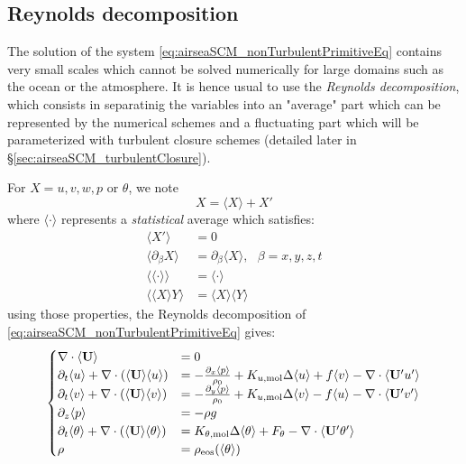 \subsection{Reynolds decomposition}
The solution of the system \eqref{eq:airseaSCM_nonTurbulentPrimitiveEq}
contains very small scales which cannot be solved numerically for
large domains such as the ocean or the atmosphere. It is hence usual
to use the \textit{Reynolds decomposition}, which consists in
separatinig the variables into an "average" part which can be
represented by the numerical schemes and a fluctuating part which
will be parameterized with turbulent closure schemes
(detailed later in \S \ref{sec:airseaSCM_turbulentClosure}).
\par
For $X=u, v, w, p$ or $\theta$, we note
\begin{equation}
	X = \langle X\rangle + X'
\end{equation}
where $\langle \cdot \rangle$ represents a \textit{statistical}
average which satisfies:
\begin{equation}
\begin{aligned}
	\langle X' \rangle &= 0 \\
	\langle \partial_\beta X \rangle &=
	\partial_\beta \langle  X \rangle, ~~~\beta=x,y,z,t \\
	\langle\langle \cdot \rangle\rangle &= \langle \cdot \rangle \\
	\langle \langle X \rangle Y\rangle &= \langle X \rangle\langle Y \rangle
\end{aligned}
\end{equation}
using those properties, the Reynolds decomposition of 
\eqref{eq:airseaSCM_nonTurbulentPrimitiveEq} gives:
\begin{equation}
	\label{eq:airseaSCM_TurbulentPrimitiveEq}
\begin{cases}
	\nabla \cdot \langle\mathbf{U}\rangle &= 0 \\
	\partial_t \langle u \rangle+ \nabla \cdot
	(\langle\mathbf{U}\rangle \langle u\rangle) &=
	- \frac{\partial_x \langle p\rangle}{\rho_0} +
	K_{u, {\rm mol}} \Delta \langle u\rangle
	+ f \langle v\rangle - \nabla \cdot \langle
	\mathbf{U}' u'\rangle\\
	\partial_t \langle v\rangle + \nabla \cdot
	(\langle \mathbf{U}\rangle \langle v\rangle) &=
	- \frac{\partial_y \langle p\rangle}{\rho_0} +
	K_{u, {\rm mol}} \Delta \langle v\rangle
	- f \langle u\rangle  - \nabla \cdot \langle
	\mathbf{U}' v'\rangle\\
	\partial_z\langle p\rangle &= -\rho g \\
	\partial_t \langle\theta\rangle + \nabla \cdot
	(\langle\mathbf{U}\rangle \langle\theta\rangle) &=
	K_{\theta, {\rm mol}} \Delta \langle\theta\rangle
	+ F_\theta - \nabla \cdot \langle
	\mathbf{U}' \theta'\rangle\\
	\rho &= \rho_{\rm eos}(\langle\theta\rangle)
\end{cases}
\end{equation}

